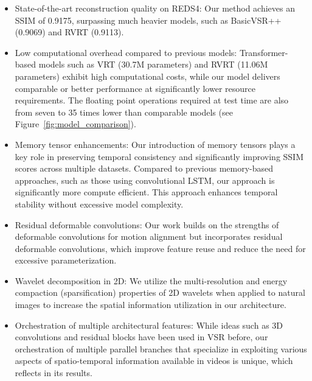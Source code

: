 \begin{itemize}
\item State-of-the-art reconstruction quality on REDS4\cite{Nah_2019_CVPR_Workshops_SR}: Our method achieves an SSIM of 0.9175, surpassing much heavier models, such as BasicVSR++\cite{chan2022basicvsr++} (0.9069) and RVRT (0.9113)\cite{liang2022rvrt}.

\item Low computational overhead compared to previous models: Transformer-based models such as VRT (30.7M parameters)\cite{liang2022vrt} and RVRT (11.06M parameters)\cite{liang2022rvrt} exhibit high computational costs, while our model delivers comparable or better performance at significantly lower resource requirements. The floating point operations required at test time are also from seven to 35 times lower than comparable models (see Figure~\ref{fig:model_comparison}).
    
\item Memory tensor enhancements: Our introduction of memory tensors plays a key role in preserving temporal consistency and significantly improving SSIM scores across multiple datasets. Compared to previous memory-based approaches, such as those using convolutional LSTM, our approach is significantly more compute efficient. %
This approach enhances temporal stability without excessive model complexity.

\item Residual deformable convolutions: Our work builds on the strengths of deformable convolutions for motion alignment but incorporates residual deformable convolutions, which improve feature reuse and reduce the need for excessive parameterization.

\item Wavelet decomposition in 2D: We utilize the multi-resolution and energy compaction (sparsification) properties of 2D wavelets when applied to natural images to increase the spatial information utilization in our architecture.

\item Orchestration of multiple architectural features: While ideas such as 3D convolutions and residual blocks have been used in VSR before, our orchestration of multiple parallel branches that specialize in exploiting various aspects of spatio-temporal information available in videos is unique, which reflects in its results.

\end{itemize}